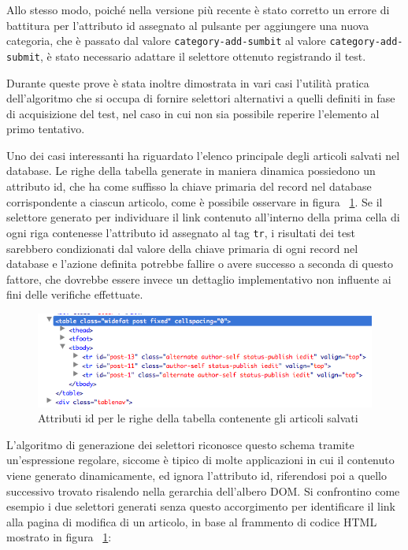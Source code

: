 \documentclass[12pt]{toptesi}
\begin{document}
Allo stesso modo, poiché nella versione più recente è stato corretto un errore di battitura per l'attributo id assegnato al pulsante per aggiungere una nuova categoria, che è passato dal valore \verb|category-add-sumbit| al valore \verb|category-add-submit|, è stato necessario adattare il selettore ottenuto registrando il test.

Durante queste prove è stata inoltre dimostrata in vari casi l'utilità pratica dell'algoritmo che si occupa di fornire selettori alternativi a quelli definiti in fase di acquisizione del test, nel caso in cui non sia possibile reperire l'elemento al primo tentativo.

Uno dei casi interessanti ha riguardato l'elenco principale degli articoli salvati nel database. Le righe della tabella generate in maniera dinamica possiedono un attributo id, che ha come suffisso la chiave primaria del record nel database corrispondente a ciascun articolo, come è possibile osservare in figura ~\ref{fig:trId}. Se il selettore generato per individuare il link contenuto all'interno della prima cella di ogni riga contenesse l'attributo id assegnato al tag \verb|tr|, i risultati dei test sarebbero condizionati dal valore della chiave primaria di ogni record nel database e l'azione definita potrebbe fallire o avere successo a seconda di questo fattore, che dovrebbe essere invece un dettaglio implementativo non influente ai fini delle verifiche effettuate.

\begin{figure}[htbp]
\begin{center}
\includegraphics[width=\textwidth]{images/wp_tour/10_firebug_tr_id.png}
\caption{Attributi id per le righe della tabella contenente gli articoli salvati}
\label{fig:trId}
\end{center}
\end{figure}

L'algoritmo di generazione dei selettori riconosce questo schema tramite un'espressione regolare, siccome è tipico di molte applicazioni in cui il contenuto viene generato dinamicamente, ed ignora l'attributo id, riferendosi poi a quello successivo trovato risalendo nella gerarchia dell'albero DOM. Si confrontino come esempio i due selettori generati senza questo accorgimento per identificare il link alla pagina di modifica di un articolo, in base al frammento di codice HTML mostrato in figura ~\ref{fig:trId}:
\end{document}
